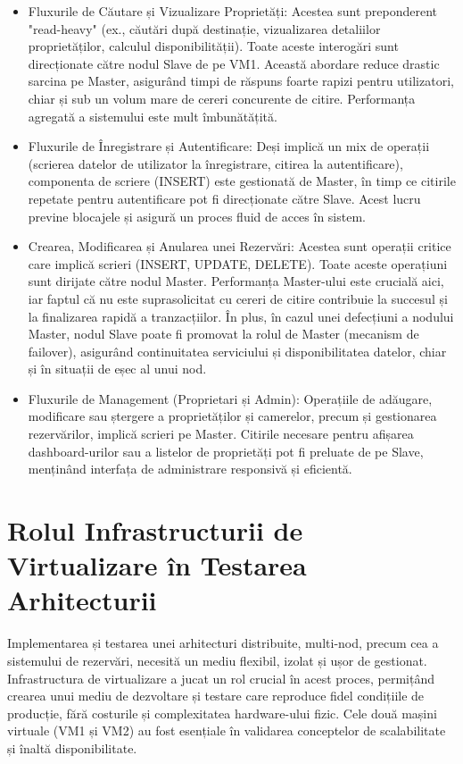 \documentclass[12pt, a4paper, oneside, romanian]{teza-upb}
\begin{document}
\begin{itemize}
	\item Fluxurile de Căutare și Vizualizare Proprietăți: Acestea sunt preponderent "read-heavy" (ex., căutări după destinație, vizualizarea detaliilor proprietăților, calculul disponibilității). Toate aceste interogări sunt direcționate către nodul Slave de pe VM1. Această abordare reduce drastic sarcina pe Master, asigurând timpi de răspuns foarte rapizi pentru utilizatori, chiar și sub un volum mare de cereri concurente de citire. Performanța agregată a sistemului este mult îmbunătățită.
	\item Fluxurile de Înregistrare și Autentificare: Deși implică un mix de operații (scrierea datelor de utilizator la înregistrare, citirea la autentificare), componenta de scriere (INSERT) este gestionată de Master, în timp ce citirile repetate pentru autentificare pot fi direcționate către Slave. Acest lucru previne blocajele și asigură un proces fluid de acces în sistem.
	\item Crearea, Modificarea și Anularea unei Rezervări: Acestea sunt operații critice care implică scrieri (INSERT, UPDATE, DELETE). Toate aceste operațiuni sunt dirijate către nodul Master. Performanța Master-ului este crucială aici, iar faptul că nu este suprasolicitat cu cereri de citire contribuie la succesul și la finalizarea rapidă a tranzacțiilor. În plus, în cazul unei defecțiuni a nodului Master, nodul Slave poate fi promovat la rolul de Master (mecanism de failover), asigurând continuitatea serviciului și disponibilitatea datelor, chiar și în situații de eșec al unui nod.
	\item Fluxurile de Management (Proprietari și Admin): Operațiile de adăugare, modificare sau ștergere a proprietăților și camerelor, precum și gestionarea rezervărilor, implică scrieri pe Master. Citirile necesare pentru afișarea dashboard-urilor sau a listelor de proprietăți pot fi preluate de pe Slave, menținând interfața de administrare responsivă și eficientă.
\end{itemize}




\section{Rolul Infrastructurii de Virtualizare în Testarea Arhitecturii}
Implementarea și testarea unei arhitecturi distribuite, multi-nod, precum cea a sistemului de rezervări, necesită un mediu flexibil, izolat și ușor de gestionat. Infrastructura de virtualizare a jucat un rol crucial în acest proces, permițând crearea unui mediu de dezvoltare și testare care reproduce fidel condițiile de producție, fără costurile și complexitatea hardware-ului fizic. Cele două mașini virtuale (VM1 și VM2)  au fost esențiale în validarea conceptelor de scalabilitate și înaltă disponibilitate.
\end{document}
